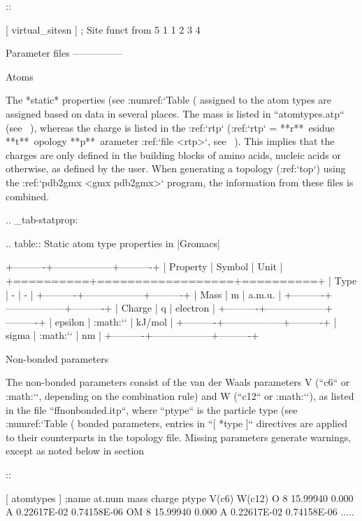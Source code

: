 ::

    [ virtual_sitesn ]
    ; Site   funct    from
    5        1        1     2     3     4

Parameter files
---------------

Atoms
~~~~~

The *static* properties (see :numref:`Table (%
assigned to the atom types are assigned based on data in several places.
The mass is listed in ``atomtypes.atp``
(see 
), whereas the charge is listed
in the :ref:`rtp` (:ref:`rtp` = **r**\ esidue **t**\ opology
**p**\ arameter :ref:`file <rtp>`, see 
). This implies
that the charges are only defined in the building
blocks
of amino acids, nucleic acids
or otherwise, as defined by the user. When generating a topology
(:ref:`top`) using the
:ref:`pdb2gmx <gmx pdb2gmx>` program, the
information from these files is combined.

.. _tab-statprop:

.. table:: Static atom type properties in |Gromacs|

           +----------+------------------+----------+
           | Property | Symbol           | Unit     |
           +==========+==================+==========+
           | Type     | -                | -        |
           +----------+------------------+----------+
           | Mass     | m                | a.m.u.   |
           +----------+------------------+----------+
           | Charge   | q                | electron |
           +----------+------------------+----------+
           | epsilon  | :math:`\epsilon` | kJ/mol   |
           +----------+------------------+----------+
           | sigma    | :math:`\sigma`   | nm       |
           +----------+------------------+----------+


Non-bonded parameters
~~~~~~~~~~~~~~~~~~~~~

The non-bonded
parameters
consist of the van der Waals parameters V (``c6`` or
:math:`\sigma`, depending on the combination rule) and W
(``c12`` or :math:`\epsilon`), as listed in the file
``ffnonbonded.itp``, where ``ptype`` is the
particle type (see :numref:`Table (%
bonded parameters, entries in ``[ *type ]`` directives are
applied to their counterparts in the topology file. Missing parameters
generate warnings, except as noted below in
section 

::

    [ atomtypes ]
    ;name   at.num      mass      charge   ptype         V(c6)        W(c12)
        O        8  15.99940       0.000       A   0.22617E-02   0.74158E-06
       OM        8  15.99940       0.000       A   0.22617E-02   0.74158E-06
       .....

